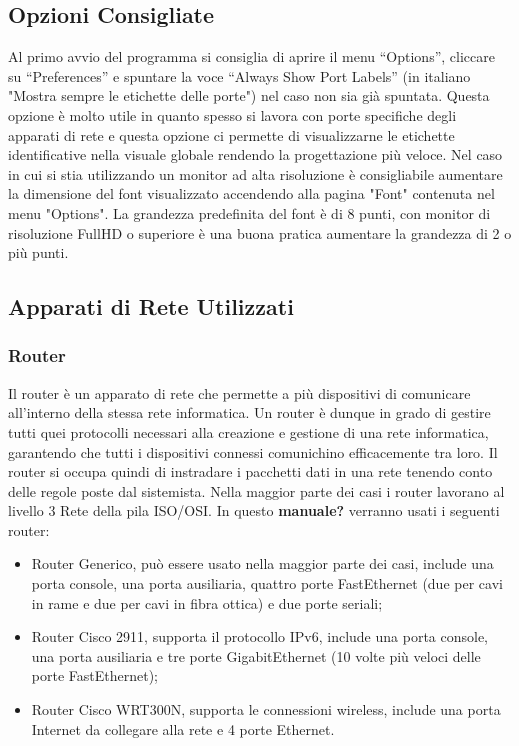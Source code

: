 \subsection{Opzioni Consigliate}
Al primo avvio del programma si consiglia di aprire il menu “Options”, cliccare su “Preferences” e spuntare la voce “Always Show Port Labels” (in italiano "Mostra sempre le etichette delle porte") nel caso non sia già spuntata. Questa opzione è molto utile in quanto spesso si lavora con porte specifiche degli apparati di rete e questa opzione ci permette di visualizzarne le etichette identificative nella visuale globale rendendo la progettazione più veloce. \newline
\smallskip
\newline
Nel caso in cui si stia utilizzando un monitor ad alta risoluzione è consigliabile aumentare la dimensione del font visualizzato accendendo alla pagina "Font" contenuta nel menu "Options". La grandezza predefinita del font è di 8 punti, con monitor di risoluzione FullHD o superiore è una buona pratica aumentare la grandezza di 2 o più punti.

\subsection{Apparati di Rete Utilizzati}

\subsubsection{Router}
Il router è un apparato di rete che permette a più dispositivi di comunicare all'interno della stessa rete informatica. Un router è dunque in grado di gestire tutti quei protocolli necessari alla creazione e gestione di una rete informatica, garantendo che tutti i dispositivi connessi comunichino efficacemente tra loro. Il router si occupa quindi di instradare i pacchetti dati in una rete tenendo conto delle regole poste dal sistemista. Nella maggior parte dei casi i router lavorano al livello 3 Rete della pila ISO/OSI. \newline
\smallskip
\newline
In questo \textbf{manuale?} verranno usati i seguenti router:

\begin{itemize}
    \item Router Generico, può essere usato nella maggior parte dei casi, include una porta console, una porta ausiliaria, quattro porte FastEthernet (due per cavi in rame e due per cavi in fibra ottica) e due porte seriali;
    \item Router Cisco 2911, supporta il protocollo IPv6, include una porta console, una porta ausiliaria e tre porte GigabitEthernet (10 volte più veloci delle porte FastEthernet);
    \item Router Cisco WRT300N, supporta le connessioni wireless, include una porta Internet da collegare alla rete e 4 porte Ethernet.
\end{itemize}

